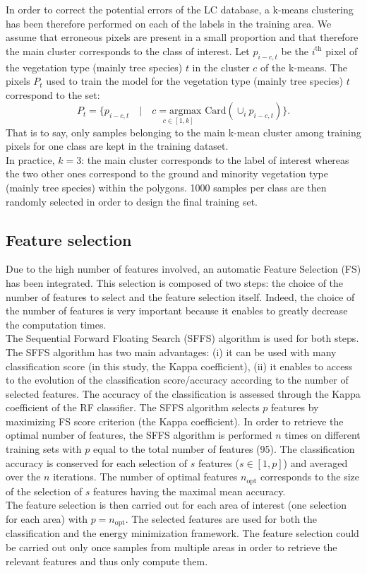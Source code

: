 In order to correct the potential errors of the LC database, a k-means clustering has been therefore performed on each of the labels in the training area. We assume that erroneous pixels are present in a small proportion and that therefore the main cluster corresponds to the class of interest. Let $p_{i-c,t}$ be the $i^{\text{th}}$ pixel of the vegetation type (mainly tree species) $t$ in the cluster $c$ of the k-means. The pixels $P_{t}$ used to train the model for the vegetation type (mainly tree species) $t$ correspond to the set:
\begin{equation}
P_{t} = \{{p_{i-c,t} \quad | \quad \underset{c \in [1,k]}{c=\text{argmax }}\text{Card} ( \cup_{i} p_{i-c,t} ) } \}.
\end{equation}
That is to say, only samples belonging to the main k-mean cluster among training pixels for one class are kept in the training dataset. \\
In practice, $k=3$: the main cluster corresponds to the label of interest whereas the two other ones correspond to the ground and minority vegetation type (mainly tree species) within the polygons. 1000 samples per class are then randomly selected in order to design the final training set.

\subsection{Feature selection}
Due to the high number of features involved, an automatic Feature Selection (FS) has been integrated. This selection is composed of two steps: the choice of the number of features to select and the feature selection itself. Indeed, the choice of the number of features is very important because it enables to greatly decrease the computation times. \\
The Sequential Forward Floating Search (SFFS) \citep{pudil1994floating} algorithm is used for both steps. The SFFS algorithm has two main advantages: (i) it can be used with many classification score (in this study, the Kappa coefficient), (ii) it enables to access to the evolution of the classification score/accuracy according to the number of selected features. The accuracy of the classification is assessed through the Kappa coefficient of the RF classifier. The SFFS algorithm selects $p$ features by maximizing FS score criterion (the Kappa coefficient). In order to retrieve the optimal number of features, the SFFS algorithm is performed $n$ times on different training sets with $p$ equal to the total number of features (95). The classification accuracy is conserved for each selection of $s$ features ($s \in [1, p]$) and averaged over the $n$ iterations. The number of optimal features $n_{\text{opt}}$ corresponds to the size of the selection of $s$ features having the maximal mean accuracy. \\
The feature selection is then carried out for each area of interest (one selection for each area) with $p=n_{\text{opt}}$. The selected features are used for both the classification and the energy minimization framework. The feature selection could be carried out only once samples from multiple areas in order to retrieve the relevant features and thus only compute them.


